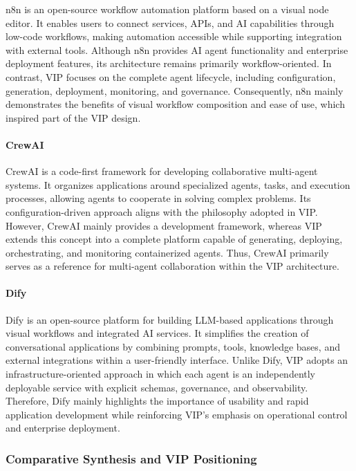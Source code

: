n8n is an open-source workflow automation platform based on a visual node editor. It enables users to connect services, APIs, and AI capabilities through low-code workflows, making automation accessible while supporting integration with external tools. Although n8n provides AI agent functionality and enterprise deployment features, its architecture remains primarily workflow-oriented. In contrast, VIP focuses on the complete agent lifecycle, including configuration, generation, deployment, monitoring, and governance. Consequently, n8n mainly demonstrates the benefits of visual workflow composition and ease of use, which inspired part of the VIP design.
\paragraph{CrewAI}

CrewAI is a code-first framework for developing collaborative multi-agent systems. It organizes applications around specialized agents, tasks, and execution processes, allowing agents to cooperate in solving complex problems. Its configuration-driven approach aligns with the philosophy adopted in VIP. However, CrewAI mainly provides a development framework, whereas VIP extends this concept into a complete platform capable of generating, deploying, orchestrating, and monitoring containerized agents. Thus, CrewAI primarily serves as a reference for multi-agent collaboration within the VIP architecture.
\paragraph{Dify}

Dify is an open-source platform for building LLM-based applications through visual workflows and integrated AI services. It simplifies the creation of conversational applications by combining prompts, tools, knowledge bases, and external integrations within a user-friendly interface. Unlike Dify, VIP adopts an infrastructure-oriented approach in which each agent is an independently deployable service with explicit schemas, governance, and observability. Therefore, Dify mainly highlights the importance of usability and rapid application development while reinforcing VIP's emphasis on operational control and enterprise deployment.
\setcounter{secnumdepth}{3}
\setcounter{tocdepth}{3}

\subsubsection{Comparative Synthesis and VIP Positioning}

